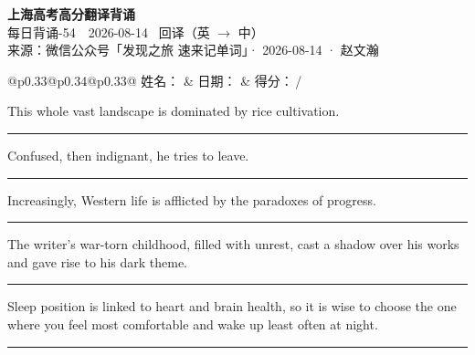 \documentclass[11pt,a4paper]{article}
\newcommand{\num}[1]{\makebox[1.9em][r]{#1.}\hspace{0.3em}}
\newcommand{\wline}{\noindent\rule{\linewidth}{0.4pt}}
\begin{document}
\pagestyle{plain}
\begin{center}
{\LARGE\bfseries 上海高考高分翻译背诵 }\\[0.25em]
{\large 每日背诵-54　2026-08-14 \quad\ 回译（英 $\to$ 中）}\\[0.35em]
{\footnotesize 来源：微信公众号「发现之旅 速来记单词」· 2026-08-14 · 赵文瀚}
\end{center}

\vspace{0.4em}
\noindent\begin{tabular}{@{}p{0.33\textwidth}@{}p{0.34\textwidth}@{}p{0.33\textwidth}@{}}
姓名：\underline{\hspace{2.0cm}} & 日期：\underline{\hspace{2.0cm}} & 得分：\underline{\hspace{1.4cm}}\,/ \\
\end{tabular}

\vspace{0.5em}

\vspace{0.8em}
\num{1}This whole vast landscape is dominated by rice cultivation.

\vspace{0.25em}

\wline

\num{2}Confused, then indignant, he tries to leave.

\vspace{0.25em}

\wline

\num{3}Increasingly, Western life is afflicted by the paradoxes of progress.

\vspace{0.25em}

\wline

\num{4}The writer’s war-torn childhood, filled with unrest, cast a shadow over his works and gave rise to his dark theme.

\vspace{0.25em}

\wline

\num{5}Sleep position is linked to heart and brain health, so it is wise to choose the one where you feel most comfortable and wake up least often at night.

\vspace{0.25em}

\wline
\end{document}
